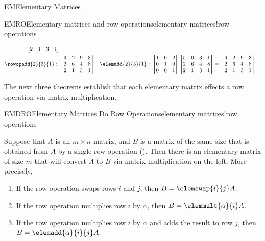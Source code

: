 \begin{subsect}{EM}{Elementary Matrices}
\begin{example}{EMRO}{Elementary matrices and row operations}{elementary matrices!row operations}
\begin{para}
\begin{align*}
\begin{bmatrix}
2 & 1 & 3 & 1
\end{bmatrix}\\
%
%
\rowopadd{2}{3}{1}:\ &
\begin{bmatrix}
9 & 2 & 9 & 3\\
2 & 6 & 4 & 8\\
2 & 1 & 3 & 1
\end{bmatrix}
&
\elemadd{2}{3}{1}:\ &
\begin{bmatrix}
1 & 0 & 2\\
0 & 1 & 0\\
0 & 0 & 1
\end{bmatrix}
\begin{bmatrix}
5 & 0 & 3 & 1\\
2 & 6 & 4 & 8\\
2 & 1 & 3 & 1
\end{bmatrix}
=
\begin{bmatrix}
9 & 2 & 9 & 3\\
2 & 6 & 4 & 8\\
2 & 1 & 3 & 1
\end{bmatrix}
%
%
\end{align*}
\end{para}
%
\end{example}
%
\begin{para}The next three theorems establish that each elementary matrix effects a row operation via matrix multiplication.\end{para}
%
\begin{theorem}{EMDRO}{Elementary Matrices Do Row Operations}{elementary matrices!row operations}
\begin{para}Suppose that $A$ is an $m\times n$ matrix, and $B$ is a matrix of the same size that is obtained from $A$ by a single row operation ().  Then there is an elementary matrix of size $m$ that will convert $A$ to $B$ via matrix multiplication on the left.  More precisely,
\begin{enumerate}
\item  If the row operation swaps rows $i$ and $j$,
then $B=\elemswap{i}{j}A$.
\item  If the row operation multiplies row $i$ by $\alpha$,
then $B=\elemmult{\alpha}{i}A$.
\item  If the row operation multiplies row $i$ by $\alpha$ and adds the result to row $j$,
then $B=\elemadd{\alpha}{i}{j}A$.
\end{enumerate}
\end{para}
\end{theorem}

\end{subsect}
